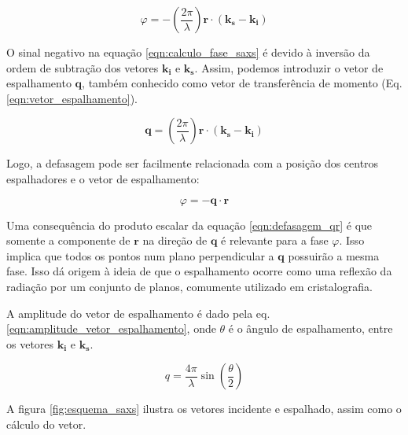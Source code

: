 		\begin{equation}
			\varphi = - \left( \dfrac{2\pi}{\lambda} \right) \mathbf{r} \cdot \left( \mathbf{k_s} - \mathbf{k_i} \right)
			\label{eqn:calculo_fase_saxs}
		\end{equation}
		
		O sinal negativo na equação \ref{eqn:calculo_fase_saxs} é devido à inversão da ordem de subtração dos vetores \(\mathbf{k_i}\) e \(\mathbf{k_s}\). Assim, podemos introduzir o vetor de espalhamento \(\mathbf{q}\), também conhecido como vetor de transferência de momento (Eq. \ref{eqn:vetor_espalhamento}).
		
		\begin{equation}
			\mathbf{q} = \left( \dfrac{2\pi}{\lambda} \right) \mathbf{r} \cdot \left( \mathbf{k_s} - \mathbf{k_i} \right)
			\label{eqn:vetor_espalhamento}
		\end{equation}
		
		Logo, a defasagem pode ser facilmente relacionada com a posição dos centros espalhadores e o vetor de espalhamento:
		
		\begin{equation}
			\varphi = - \mathbf{q} \cdot \mathbf{r}
			\label{eqn:defasagem_qr}
		\end{equation}
		
		Uma consequência do produto escalar da equação \ref{eqn:defasagem_qr} é que somente a componente de \(\mathbf{r}\) na direção de \(\mathbf{q}\) é relevante para a fase \(\varphi\). Isso implica que todos os pontos num plano perpendicular a \(\mathbf{q}\) possuirão a mesma fase. Isso dá origem à ideia de que o espalhamento ocorre como uma reflexão da radiação por um conjunto de planos, comumente utilizado em cristalografia.
		
		A amplitude do vetor de espalhamento é dado pela eq. \ref{eqn:amplitude_vetor_espalhamento}, onde \(\theta\) é o ângulo de espalhamento, entre os vetores \(\mathbf{k_i}\) e \(\mathbf{k_s}\).
		
		\begin{equation}
		q = \dfrac{4\pi}{\lambda} \sin\left(\dfrac{\theta}{2}\right)
		\label{eqn:amplitude_vetor_espalhamento}
		\end{equation}
		
		A figura \ref{fig:esquema_saxs} ilustra os vetores incidente e espalhado, assim como o cálculo do vetor.
		
